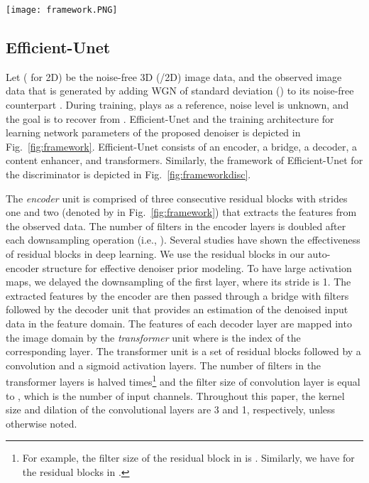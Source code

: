 \documentclass[journal,twoside,web]{ieeecolor}
\begin{document}
\begin{figure*} 
\centering
    \texttt{[image: framework.PNG]}
\caption{Framework of the Efficient-Unet for denoiser with the training steps. Efficient-Unet is composed of the encoder, decoder, and Content Enhancer blocks. The output of the decoder at every scale is mapped into the image domain by a Transformer block. We then enforce consistency between the outputs of the decoder and their counterparts . Low-level features further contribute into the denoised image by the Content Enhancer block. When the noise level is low, the filters of this block are activated improving the convergence with no need for high-level features.
}
\label{fig:framework}
\end{figure*}

\subsection{Efficient-Unet}\label{sec:Efficient}
Let  (  for 2D) be the noise-free 3D (/2D) image data, and  the observed image data that is generated by adding WGN of standard deviation () to its noise-free counterpart . 
During training,  plays as a reference, noise level  is unknown, and the goal is to recover  from . Efficient-Unet and the training architecture for learning network parameters of the proposed denoiser is depicted in Fig.~\ref{fig:framework}. Efficient-Unet consists of an encoder, a bridge, a decoder, a content enhancer, and transformers. Similarly, the framework of Efficient-Unet for the discriminator is depicted in Fig.~\ref{fig:frameworkdisc}.

The \textit{encoder} unit is comprised of three consecutive residual blocks with strides one and two (denoted by  in Fig.~\ref{fig:framework}) that extracts the features from the observed data. 
The number of filters in the encoder layers is doubled after each downsampling operation (i.e., ). Several studies\cite{he2016deep,zhang2017beyond,sharif2020learning} have shown the effectiveness of residual blocks in deep learning. We use the residual blocks in our auto-encoder structure for effective denoiser prior modeling. To have large activation maps, we delayed the downsampling of the first layer, where its stride is 1. 
The extracted features by the encoder are then passed through a bridge with  filters followed by the decoder unit that provides an estimation of the denoised input data  in the feature domain. The features of each decoder layer are mapped into the image domain by the \textit{transformer} unit  where  is the index of the corresponding layer. 
The transformer unit is a set of  residual blocks followed by a  convolution and a sigmoid activation layers. The number of filters in the transformer layers is halved  times\footnote{For example, the filter size of the residual block in  is . Similarly, we have  for the residual blocks in .} and the filter size of  convolution layer is equal to , which is the number of input channels. Throughout this paper, the kernel size and dilation of the convolutional layers are 3 and 1, respectively, unless otherwise noted. 
\end{document}
